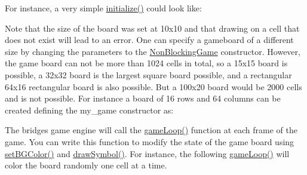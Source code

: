 For instance, a very simple \mbox{\hyperlink{classbridges_1_1games_1_1_game_base_a973a52d5eee7c29b01d668fba3c61657}{initialize()}} could look like\+: 
\begin{DoxyCode}{0}
\DoxyCodeLine{\}}
\end{DoxyCode}


Note that the size of the board was set at 10x10 and that drawing on a cell that does not exist will lead to an error. One can specify a gameboard of a different size by changing the parameters to the \mbox{\hyperlink{classbridges_1_1games_1_1_non_blocking_game}{Non\+Blocking\+Game}} constructor. However, the game board can not be more than 1024 cells in total, so a 15x15 board is possible, a 32x32 board is the largest square board possible, and a rectangular 64x16 rectangular board is also possible. But a 100x20 board would be 2000 cells and is not possible. For instance a board of 16 rows and 64 columns can be created defining the my\+\_\+game constructor as\+:


\begin{DoxyCode}{0}
\end{DoxyCode}


The bridges game engine will call the \mbox{\hyperlink{classbridges_1_1games_1_1_game_base_a56d05ed744791cfc1c3792f39ff438f1}{game\+Loop()}} function at each frame of the game. You can write this function to modify the state of the game board using \mbox{\hyperlink{classbridges_1_1games_1_1_game_base_ac9a231dd4425eb0f9dea2377653b23c4}{set\+B\+G\+Color()}} and \mbox{\hyperlink{classbridges_1_1games_1_1_game_base_a7dd4caecd0522dcf7fc275517fbc695d}{draw\+Symbol()}}. For instance, the following \mbox{\hyperlink{classbridges_1_1games_1_1_game_base_a56d05ed744791cfc1c3792f39ff438f1}{game\+Loop()}} will color the board randomly one cell at a time.


\begin{DoxyCode}{0}
\DoxyCodeLine{\}}
\end{DoxyCode}


